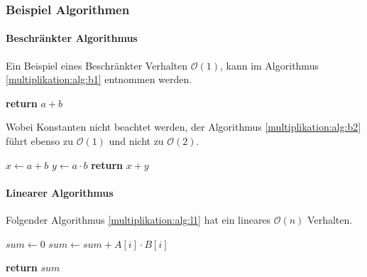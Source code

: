 \subsubsection{Beispiel Algorithmen}
\paragraph{Beschr\"ankter Algorithmus}

Ein Beispiel eines Beschr\"ankter Verhalten $\mathcal{O}(1)$, kann im Algorithmus \ref{multiplikation:alg:b1} entnommen werden.

\begin{algorithm}\caption{}
	\label{multiplikation:alg:b1}
	\setlength{\lineskip}{7pt}
	\begin{algorithmic}
		\State \textbf{return} $a+b$
		\EndFunction
	\end{algorithmic}
\end{algorithm}

Wobei Konstanten nicht beachtet werden, der Algorithmus \ref{multiplikation:alg:b2} f\"uhrt ebenso zu  $\mathcal{O}(1)$ und nicht zu $\mathcal{O}(2)$.

\begin{algorithm}\caption{}
	\label{multiplikation:alg:b2}
	\setlength{\lineskip}{7pt}
	\begin{algorithmic}
		\Function{B2}{$a, b$}
		\State $ x \gets a+b $
		\State $ y \gets a \cdot b $
		\State \textbf{return} $x+y$
		\EndFunction
	\end{algorithmic}
\end{algorithm}

\paragraph{Linearer Algorithmus}

Folgender Algorithmus \ref{multiplikation:alg:l1} hat ein lineares $\mathcal{O}(n)$ Verhalten.

\begin{algorithm}\caption{}
	\setlength{\lineskip}{7pt}
	\begin{algorithmic}
		\label{multiplikation:alg:l1}
		\Function{L}{$\mathbf{A}, \mathbf{B}$,n}
		\State $ sum \gets 0$
		\For{$i = 0,1,2 \dots,n$}
		\State $ sum \gets sum + A[i] \cdot B[i] $
		\EndFor
		
		\State \textbf{return} $sum$
		
		\EndFunction
	\end{algorithmic}
\end{algorithm}

